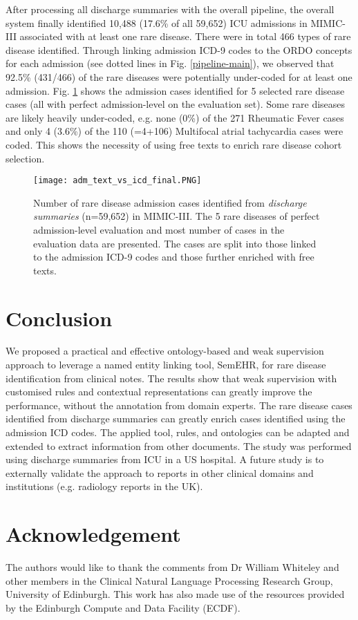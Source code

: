 \documentclass[letterpaper, 10 pt, conference]{ieeeconf}
\begin{document}
After processing all discharge summaries with the overall pipeline, the overall system finally identified 10,488 (17.6\% of all 59,652) ICU admissions in MIMIC-III associated with at least one rare disease. There were in total 466 types of rare disease identified. Through linking admission ICD-9 codes to the ORDO concepts for each admission (see dotted lines in Fig. \ref{pipeline-main}), we observed that 92.5\% (431/466) of the rare diseases were potentially under-coded for at least one admission. Fig. \ref{text_vs_icd_fig} shows the admission cases identified for 5 selected rare disease cases (all with perfect admission-level  on the evaluation set). Some rare diseases are likely heavily under-coded, e.g. none (0\%) of the 271 Rheumatic Fever cases and only 4 (3.6\%) of the 110 (=4+106) Multifocal atrial tachycardia cases were coded. This shows the necessity of using free texts to enrich rare disease cohort selection.
\begin{figure}
  \centering
  \texttt{[image: adm\_text\_vs\_icd\_final.PNG]}
  \caption{Number of rare disease admission cases identified from \emph{discharge summaries} (n=59,652) in MIMIC-III. The 5 rare diseases of perfect admission-level evaluation  and most number of cases in the evaluation data are presented. The cases are split into those linked to the admission ICD-9 codes and those further enriched with free texts.}\label{text_vs_icd_fig}
\end{figure}

\section{Conclusion}
We proposed a practical and effective ontology-based and weak supervision approach to leverage a named entity linking tool, SemEHR, for rare disease identification from clinical notes. The results show that weak supervision with customised rules and contextual representations can greatly improve the performance, without the annotation from domain experts. The rare disease cases identified from discharge summaries can greatly enrich cases identified using the admission ICD codes. The applied tool, rules, and ontologies can be adapted and extended to extract information from other documents. The study was performed using discharge summaries from ICU in a US hospital. A future study is to externally validate the approach to reports in other clinical domains and institutions (e.g. radiology reports in the UK).


\section*{Acknowledgement}

The authors would like to thank the comments from Dr William Whiteley and other members in the Clinical Natural Language Processing Research Group, University of Edinburgh. This work has also made use of the resources provided by the Edinburgh Compute and Data Facility (ECDF).



\end{document}
